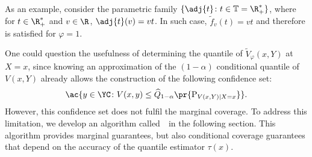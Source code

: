   As an example, consider the parametric family $\{\adj{t}\colon t\in\mathbb{T}=\R_+^*\}$, where for $t\in\R_+^*$ and $v\in\R$, $\adj{t}(v)=vt$. In such case, $\tilde{f}_{v}(t)=v t$ and therefore  is satisfied for $\varphi=1$.


  One could question the usefulness of determining the quantile of $\tilde{V}_{\varphi}(x,Y)$ at $X=x$, since knowing an approximation of the $(1-\alpha)$ conditional quantile of $V(x,Y)$ already allows the construction of the following confidence set:
  \begin{equation*}
    \ac{
      y\in\YC\colon V(x,y)\le \widehat{Q}_{1-\alpha}\pr{\textup{P}_{V(x,Y)\mid X=x}}
    }.
  \end{equation*}
   However, this confidence set  does not fulfil the marginal coverage. To address this limitation, we develop an algorithm called~\RCP\ in the following section. This algorithm provides  marginal guarantees, but also conditional coverage guarantees that depend on the accuracy of the quantile estimator \(\tau(x)\).


